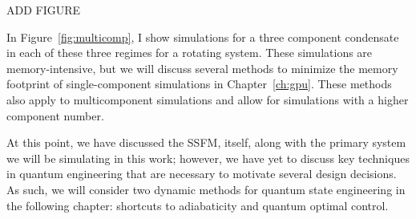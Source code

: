 ADD FIGURE

In Figure~\ref{fig:multicomp}, I show simulations for a three component condensate in each of these three regimes for a rotating system.
These simulations are memory-intensive, but we will discuss several methods to minimize the memory footprint of single-component simulations in Chapter~\ref{ch:gpu}.
These methods also apply to multicomponent simulations and allow for simulations with a higher component number.

At this point, we have discussed the SSFM, itself, along with the primary system we will be simulating in this work; however, we have yet to discuss key techniques in quantum engineering that are necessary to motivate several design decisions.
As such, we will consider two dynamic methods for quantum state engineering in the following chapter: shortcuts to adiabaticity and quantum optimal control.

